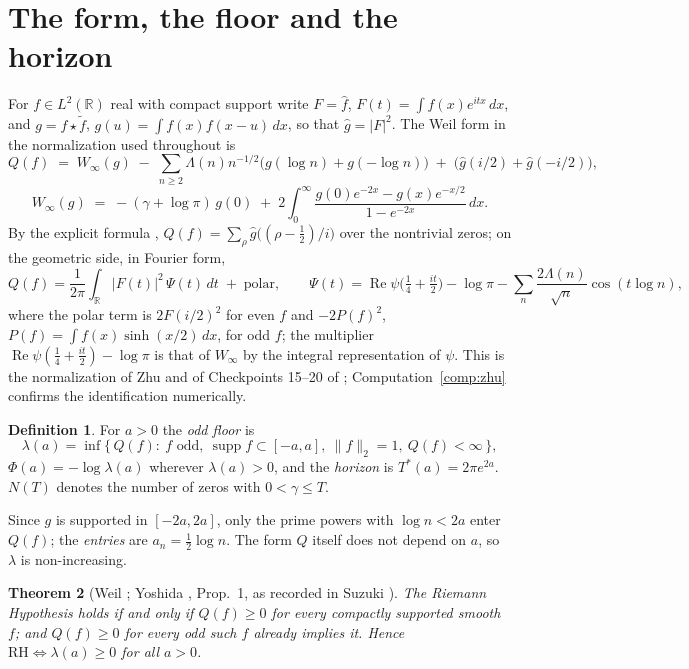 \documentclass[11pt]{article}
\newtheorem{theorem}{Theorem}[section]
\theoremstyle{definition}
\newtheorem{definition}[theorem]{Definition}
\theoremstyle{remark}
\newcommand{\R}{\mathbb{R}}
\DeclareMathOperator{\Ree}{Re}
\newcommand{\Tst}{T^{*}}
\begin{document}
\section{The form, the floor and the horizon}\label{sec:form}

For $f\in L^2(\R)$ real with compact support write $F=\hat f$, $F(t)=\int f(x)e^{itx}\,dx$, and $g=f\star\tilde f$, $g(u)=\int f(x)f(x-u)\,dx$, so that $\hat g=|F|^2$. The Weil form in the normalization used throughout is
\begin{equation}\label{eq:Q}
Q(f) \;=\; W_\infty(g)\;-\;\sum_{n\ge2}\Lambda(n)n^{-1/2}\big(g(\log n)+g(-\log n)\big)\;+\;\big(\hat g(i/2)+\hat g(-i/2)\big),
\end{equation}
\begin{equation}\label{eq:Winf}
W_\infty(g) \;=\; -(\gamma+\log\pi)\,g(0)\;+\;2\int_0^\infty \frac{g(0)e^{-2x}-g(x)e^{-x/2}}{1-e^{-2x}}\,dx .
\end{equation}
By the explicit formula \cite{weil}, $Q(f)=\sum_\rho \hat g\big((\rho-\tfrac12)/i\big)$ over the nontrivial zeros; on the geometric side, in Fourier form,
\begin{equation}\label{eq:symbol}
Q(f)=\frac1{2\pi}\int_\R |F(t)|^2\,\Psi(t)\,dt \;+\;\text{polar},\qquad
\Psi(t)=\Ree\psi\big(\tfrac14+\tfrac{it}{2}\big)-\log\pi-\sum_{n}\frac{2\Lambda(n)}{\sqrt n}\cos(t\log n),
\end{equation}
where the polar term is $2F(i/2)^2$ for even $f$ and $-2P(f)^2$, $P(f)=\int f(x)\sinh(x/2)\,dx$, for odd $f$; the multiplier $\Ree\psi(\tfrac14+\tfrac{it}2)-\log\pi$ is that of $W_\infty$ by the integral representation of $\psi$. This is the normalization of Zhu \cite{zhu} and of Checkpoints 15--20 of \cite{michaels-atlas}; Computation~\ref{comp:zhu} confirms the identification numerically.

\begin{definition}
For $a>0$ the \emph{odd floor} is
\[
\lambda(a)=\inf\{\,Q(f):\ f \text{ odd},\ \operatorname{supp}f\subset[-a,a],\ \|f\|_2=1,\ Q(f)<\infty\,\},
\]
$\Phi(a)=-\log\lambda(a)$ wherever $\lambda(a)>0$, and the \emph{horizon} is $\Tst(a)=2\pi e^{2a}$. $N(T)$ denotes the number of zeros with $0<\gamma\le T$.
\end{definition}

Since $g$ is supported in $[-2a,2a]$, only the prime powers with $\log n<2a$ enter $Q(f)$; the \emph{entries} are $a_n=\tfrac12\log n$. The form $Q$ itself does not depend on $a$, so $\lambda$ is non-increasing.

\begin{theorem}[Weil \cite{weil}; Yoshida \cite{yoshida}, Prop.\ 1, as recorded in Suzuki \cite{suzuki-screw}]\label{thm:weil}
The Riemann Hypothesis holds if and only if $Q(f)\ge0$ for every compactly supported smooth $f$; and $Q(f)\ge0$ for every odd such $f$ already implies it. Hence $\mathrm{RH}\iff \lambda(a)\ge0$ for all $a>0$.
\end{theorem}
\end{document}
